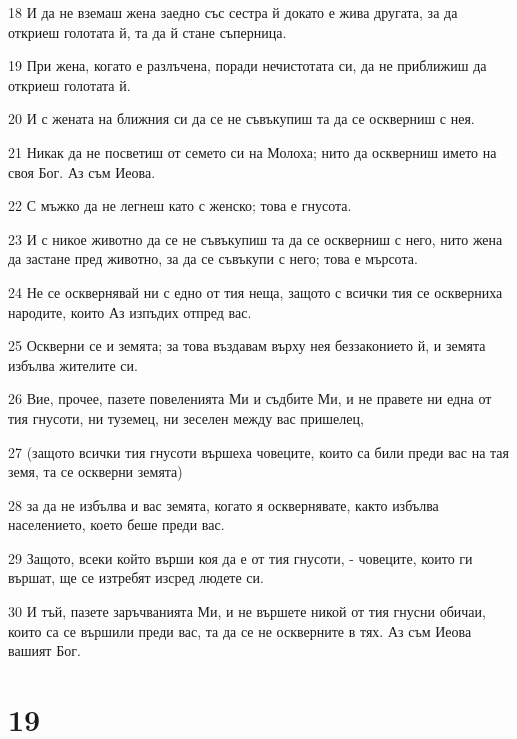 \par 18 И да не вземаш жена заедно със сестра й докато е жива другата, за да откриеш голотата й, та да й стане съперница.
\par 19 При жена, когато е разлъчена, поради нечистотата си, да не приближиш да откриеш голотата й.
\par 20 И с жената на ближния си да се не съвъкупиш та да се оскверниш с нея.
\par 21 Никак да не посветиш от семето си на Молоха; нито да оскверниш името на своя Бог. Аз съм Иеова.
\par 22 С мъжко да не легнеш като с женско; това е гнусота.
\par 23 И с никое животно да се не съвъкупиш та да се оскверниш с него, нито жена да застане пред животно, за да се съвъкупи с него; това е мърсота.
\par 24 Не се осквернявай ни с едно от тия неща, защото с всички тия се оскверниха народите, които Аз изпъдих отпред вас.
\par 25 Оскверни се и земята; за това въздавам върху нея беззаконието й, и земята избълва жителите си.
\par 26 Вие, прочее, пазете повеленията Ми и съдбите Ми, и не правете ни една от тия гнусоти, ни туземец, ни зеселен между вас пришелец,
\par 27 (защото всички тия гнусоти вършеха човеците, които са били преди вас на тая земя, та се оскверни земята)
\par 28 за да не избълва и вас земята, когато я осквернявате, както избълва населението, което беше преди вас.
\par 29 Защото, всеки който върши коя да е от тия гнусоти, - човеците, които ги вършат, ще се изтребят изсред людете си.
\par 30 И тъй, пазете заръчванията Ми, и не вършете никой от тия гнусни обичаи, които са се вършили преди вас, та да се не оскверните в тях. Аз съм Иеова вашият Бог.

\chapter{19}


